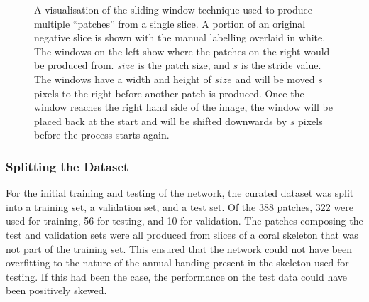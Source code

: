 \begin{figure}[t]
    \centering
    \caption{A visualisation of the sliding window technique used to produce multiple ``patches'' from a single slice. A portion of an original negative slice is shown with the manual labelling overlaid in white. The windows on the left show where the patches on the right would be produced from. $size$ is the patch size, and $s$ is the stride value. The windows have a width and height of $size$ and will be moved $s$ pixels to the right before another patch is produced. Once the window reaches the right hand side of the image, the window will be placed back at the start and will be shifted downwards by $s$ pixels before the process starts again.}
    \label{fig:slidingwindow}
\end{figure}

\subsubsection{Splitting the Dataset}

For the initial training and testing of the network, the curated dataset was split into a training set, a validation set, and a test set. Of the 388 patches, 322 were used for training, 56 for testing, and 10 for validation. The patches composing the test and validation sets were all produced from slices of a coral skeleton that was not part of the training set. This ensured that the network could not have been overfitting to the nature of the annual banding present in the skeleton used for testing. If this had been the case, the performance on the test data could have been positively skewed.

